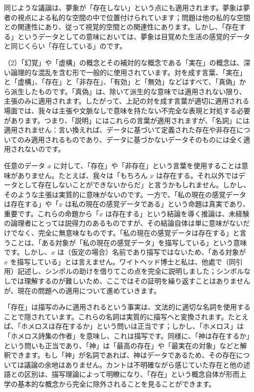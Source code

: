 \documentclass[a4paper,11pt,openany]{ltjsbook}
\begin{document}
同じような議論は、夢象が「存在しない」という点にも適用されます。夢象は夢者の視点による私的な空間の中で位置付けられています；問題は他の私的な空間との関連性にあり、従って視覚的空間との関連性にあります。しかし、「存在する」というデータとしての意味においては、夢象は目覚めた生活の感覚的データと同じくらい「存在している」のです。

（2）「幻覚」や「虚構」の概念とその補対的な概念である「実在」の概念は、深い論理的な混乱を含む形で一般的に使用されています。対を成す言葉、「実在」と「虚構」、「存在」と「非存在」、「有効」と「無効」などはすべて、「真偽」から派生したものです。「真偽」は、除いて派生的な意味では適用されない限り、主張のみに適用されます。したがって、上記の対を成す言葉が適切に適用される場面では、我々は主張や文脈なしで意味を持たない不完全な表現と対処する必要があります。つまり、「説明」にはこれらの言葉が適用されますが、「名詞」には適用されません：言い換えれば、データに基づいて定義された存在や非存在についてのみ適用されるものであり、データに基づかないデータそのものには全く適用されないのです。


任意のデータ $x$ に対して、「存在」や「非存在」という言葉を使用することは意味がありません。たとえば、我々は「もちろん $x$ は存在する。それ以外ではデータとして存在しないことができないからだ」と言うかもしれません。しかし、そのような主張は実質的に意味がないのです。一方で、「私の現在の感覚データは存在する」や「$x$ は私の現在の感覚データである」という命題は真実であり、重要です。これらの命題から「$x$ は存在する」という結論を導く推論は、未経験の論理者にとっては説得力のあるものですが、その結論自体は単に意味がないだけでなく、完全に無意味なものです。「私の現在の感覚データは存在する」と言うことは、「ある対象が「私の現在の感覚データ」を描写している」という意味です。しかし、$x$ は（仮定の場合）名前であり描写ではないため、「ある対象が $x$ を描写している」とは言えません。ワイトヘッド博士と私は、他處で（同引用）記述し、シンボルの助けを借りてこの点を完全に説明しました；シンボルなしでは理解するのが難しいため、ここではその証明を繰り返すことはありませんが、現在の問題への適用について進めていきます。

「存在」は描写のみに適用されるという事実は、文法的に適切な名詞を使用することで隠されています。これらの名詞は実質的に描写へと変換されます。たとえば、「ホメロスは存在するか」という問いは正当です；しかし、「ホメロス」は「ホメロス詩集の作者」を意味し、これは描写です。同様に、「神は存在するか」という問いも正当であり、「神」は「最高の存在」や「最実在の対象」などと解釈できます。もし「神」が名詞であれば、神はデータであるため、その存在については議論の余地はありません。カントは不明確ながら感じていた存在と他の述語との区別は、描写理論によって明瞭になり、「存在」という概念自体が形而上学の基本的な概念から完全に除外されることを見ることができます。
\end{document}
